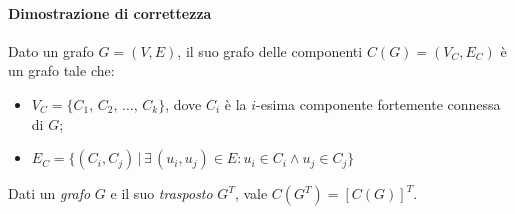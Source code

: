 \paragraph{Dimostrazione di correttezza}
\begin{definition}
    Dato un grafo $G=(V,E)$, il suo grafo delle componenti $C(G)=(V_C,E_C)$
    è un grafo tale che:
    \begin{itemize}
        \item $V_C=\{C_1,\,C_2,\,\dots,\,C_k\}$, dove $C_i$ è la $i$-esima
        componente fortemente connessa di $G$;
        \item $E_C=\{(C_i,C_{j})\,|\,\exists\,(u_i,u_j)\in E:u_i\in C_i\wedge u_j\in C_j\}$
    \end{itemize}
\end{definition}\noindent
\begin{note}
    Dati un \emph{grafo} $G$ e il suo \emph{trasposto} $G^T$, vale
    $C\left(G^T\right)=\left[C\left(G\right)\right]^T$.
\end{note}\noindent
